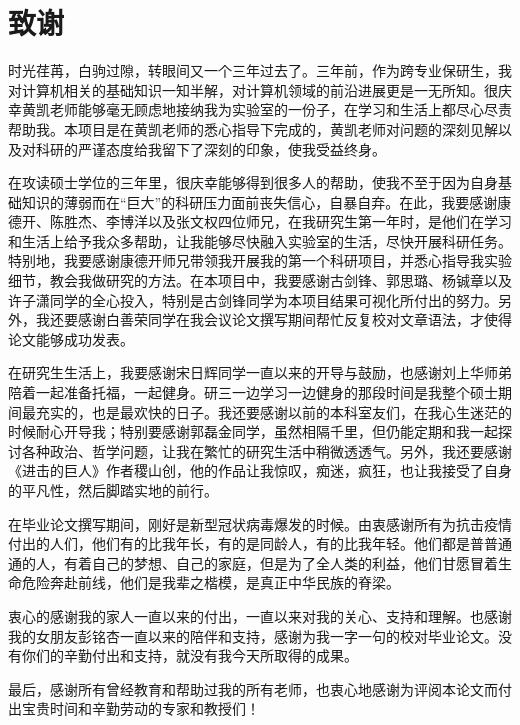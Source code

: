 
\chapter*{致\quad 谢}

时光荏苒，白驹过隙，转眼间又一个三年过去了。三年前，作为跨专业保研生，我对计算机相关的基础知识一知半解，对计算机领域的前沿进展更是一无所知。很庆幸黄凯老师能够毫无顾虑地接纳我为实验室的一份子，在学习和生活上都尽心尽责帮助我。本项目是在黄凯老师的悉心指导下完成的，黄凯老师对问题的深刻见解以及对科研的严谨态度给我留下了深刻的印象，使我受益终身。

在攻读硕士学位的三年里，很庆幸能够得到很多人的帮助，使我不至于因为自身基础知识的薄弱而在“巨大”的科研压力面前丧失信心，自暴自弃。在此，我要感谢康德开、陈胜杰、李博洋以及张文权四位师兄，在我研究生第一年时，是他们在学习和生活上给予我众多帮助，让我能够尽快融入实验室的生活，尽快开展科研任务。特别地，我要感谢康德开师兄带领我开展我的第一个科研项目，并悉心指导我实验细节，教会我做研究的方法。在本项目中，我要感谢古剑锋、郭思璐、杨铖章以及许子潇同学的全心投入，特别是古剑锋同学为本项目结果可视化所付出的努力。另外，我还要感谢白善荣同学在我会议论文撰写期间帮忙反复校对文章语法，才使得论文能够成功发表。

在研究生生活上，我要感谢宋日辉同学一直以来的开导与鼓励，也感谢刘上华师弟陪着一起准备托福，一起健身。研三一边学习一边健身的那段时间是我整个硕士期间最充实的，也是最欢快的日子。我还要感谢以前的本科室友们，在我心生迷茫的时候耐心开导我；特别要感谢郭磊金同学，虽然相隔千里，但仍能定期和我一起探讨各种政治、哲学问题，让我在繁忙的研究生活中稍微透透气。另外，我还要感谢《进击的巨人》作者稷山创，他的作品让我惊叹，痴迷，疯狂，也让我接受了自身的平凡性，然后脚踏实地的前行。

在毕业论文撰写期间，刚好是新型冠状病毒爆发的时候。由衷感谢所有为抗击疫情付出的人们，他们有的比我年长，有的是同龄人，有的比我年轻。他们都是普普通通的人，有着自己的梦想、自己的家庭，但是为了全人类的利益，他们甘愿冒着生命危险奔赴前线，他们是我辈之楷模，是真正中华民族的脊梁。

衷心的感谢我的家人一直以来的付出，一直以来对我的关心、支持和理解。也感谢我的女朋友彭铭杏一直以来的陪伴和支持，感谢为我一字一句的校对毕业论文。没有你们的辛勤付出和支持，就没有我今天所取得的成果。

最后，感谢所有曾经教育和帮助过我的所有老师，也衷心地感谢为评阅本论文而付出宝贵时间和辛勤劳动的专家和教授们！

\maketime

